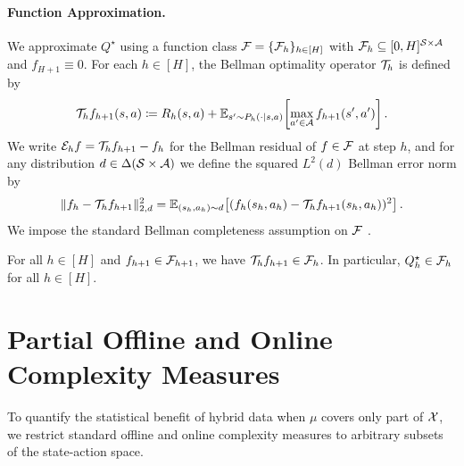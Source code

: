 \paragraph{Function Approximation.}
We approximate $Q^\star$ using a function class ${\mathcal{F}} = \{{\mathcal{F}}_h\}_{h \in [H]}$ with ${\mathcal{F}}_h \subseteq [0, H]^{{\mathcal{S}} \times {\mathcal{A}}}$ and $f_{H+1} \equiv 0$. For each $h \in [H]$, the Bellman optimality operator ${\mathcal{T}}_h$ is defined by
\begin{equation}
    {\mathcal{T}}_h f_{h+1}(s, a) \coloneqq R_h(s, a) + \mathbb{E}_{s' \sim P_h(\cdot \mid s, a)}\!\left[ \max_{a' \in {\mathcal{A}}} f_{h+1}(s', a')\right].
\end{equation}
We write ${\mathcal{E}}_h f = {\mathcal{T}}_h f_{h+1} - f_h$ for the Bellman residual of $f \in {\mathcal{F}}$ at step $h$, and for any distribution $d \in \Delta({\mathcal{S}} \times {\mathcal{A}})$ we define the squared $L^2(d)$ Bellman error norm by
\begin{equation}
    \|f_h - {\mathcal{T}}_h f_{h+1}\|^2_{2, d} = \mathbb{E}_{(s_h, a_h) \sim d}\!\left[(f_h(s_h, a_h) - {\mathcal{T}}_h f_{h+1}(s_h, a_h))^2\right].
\end{equation}
We impose the standard Bellman completeness assumption on ${\mathcal{F}}$ \citep{liu2020provably, jin2021bellmaneluder, xie2022role}.

\begin{aspt}
\label{aspt:ch02-completeness}
For all $h \in [H]$ and $f_{h+1} \in {\mathcal{F}}_{h+1}$, we have ${\mathcal{T}}_h f_{h+1} \in {\mathcal{F}}_h$. In particular, $Q^\star_h \in {\mathcal{F}}_h$ for all $h \in [H]$.
\end{aspt}

\section{Partial Offline and Online Complexity Measures}
\label{sec:ch02-gfa-complexity}

To quantify the statistical benefit of hybrid data when $\mu$ covers only part of ${\mathcal{X}}$, we restrict standard offline and online complexity measures to arbitrary subsets of the state-action space.

